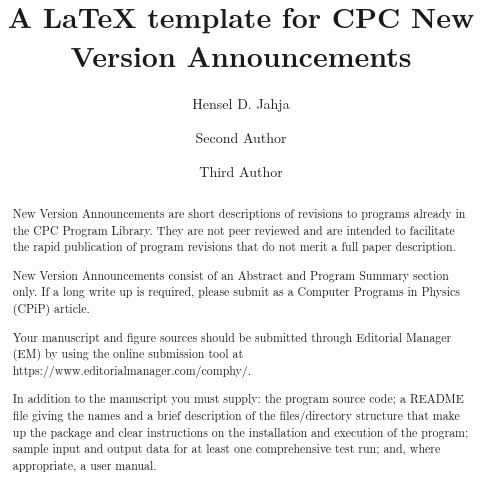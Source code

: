 \documentclass[preprint,12pt]{elsarticle}
\begin{document}
\begin{frontmatter}



  \title{A \LaTeX{} template for CPC New Version Announcements}


  \author[a]{Hensel D. Jahja}
  \author[a,b]{Second Author}
  \author[b]{Third Author}

  \address[a]{First Address}
  \address[b]{Second Address}

  \begin{abstract}
    New Version Announcements are short descriptions of revisions to programs already in the CPC Program Library. They are not peer reviewed and are intended to facilitate the rapid publication of program revisions that do not merit a full paper description.

    New Version Announcements consist of an Abstract and Program Summary section only. If a long write up is required, please submit as a Computer Programs in Physics (CPiP) article.

    Your manuscript and figure sources should be submitted through Editorial Manager (EM) by using the online submission tool at \\
    https://www.editorialmanager.com/comphy/.

    In addition to the manuscript you must supply: the program source code; a README file giving the names and a brief description of the files/directory structure that make up the package and clear instructions on the installation and execution of the program; sample input and output data for at least one comprehensive test run; and, where appropriate, a user manual.


\end{abstract}
\end{frontmatter}
\end{document}
